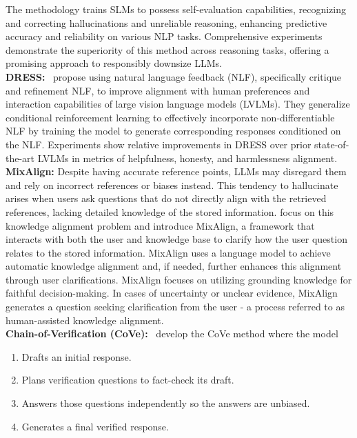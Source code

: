 \documentclass[11pt]{article}
\begin{document}
The methodology trains SLMs to possess self-evaluation capabilities, recognizing and correcting hallucinations and unreliable reasoning, enhancing predictive accuracy and reliability on various NLP tasks. Comprehensive experiments demonstrate the superiority of this method across reasoning tasks, offering a promising approach to responsibly downsize LLMs. \\
\textbf{DRESS:}~\cite{chen2023dress} propose using natural language feedback (NLF), specifically critique and refinement NLF, to improve alignment with human preferences and interaction capabilities of large vision language models (LVLMs). They generalize conditional reinforcement learning to effectively incorporate non-differentiable NLF by training the model to generate corresponding responses conditioned on the NLF. Experiments show relative improvements in DRESS over prior state-of-the-art LVLMs in metrics of helpfulness, honesty, and harmlessness alignment. \\
\textbf{MixAlign:} Despite having accurate reference points, LLMs may disregard them and rely on incorrect references or biases instead. This tendency to hallucinate arises when users ask questions that do not directly align with the retrieved references, lacking detailed knowledge of the stored information. \cite{zhang2023knowledge} focus on this knowledge alignment problem and introduce MixAlign, a framework that interacts with both the user and knowledge base to clarify how the user question relates to the stored information. MixAlign uses a language model to achieve automatic knowledge alignment and, if needed, further enhances this alignment through user clarifications. MixAlign focuses on utilizing grounding knowledge for faithful decision-making. In cases of uncertainty or unclear evidence, MixAlign generates a question seeking clarification from the user - a process referred to as human-assisted knowledge alignment. \\
\textbf{Chain-of-Verification (CoVe):}~\cite{dhuliawala2023chainofverification} develop the CoVe method where the model 
\begin{enumerate}
\item Drafts an initial response.
\item Plans verification questions to fact-check its draft.
\item Answers those questions independently so the answers are unbiased.
\item Generates a final verified response.
\end{enumerate}
 
\end{document}
